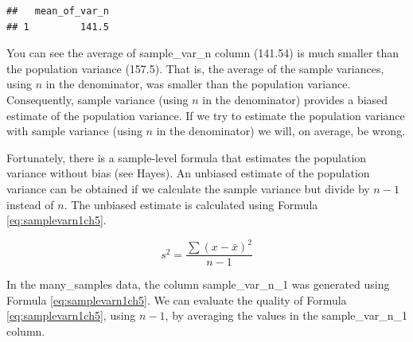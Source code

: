 \documentclass[
]{krantz}
\makeatletter
\newenvironment{Shaded}{\begin{snugshade}}{\end{snugshade}}
\newcommand{\DataTypeTok}[1]{\textcolor[rgb]{0.27,0.27,0.27}{#1}}
\newcommand{\DecValTok}[1]{\textcolor[rgb]{0.06,0.06,0.06}{#1}}
\newcommand{\KeywordTok}[1]{\textcolor[rgb]{0.27,0.27,0.27}{\textbf{#1}}}
\newcommand{\NormalTok}[1]{#1}
\newcommand{\OperatorTok}[1]{\textcolor[rgb]{0.43,0.43,0.43}{\textbf{#1}}}
\newcommand{\StringTok}[1]{\textcolor[rgb]{0.5,0.5,0.5}{#1}}
\newenvironment{kframe}{%
\medskip{}
\setlength{\fboxsep}{.8em}
 \def\at@end@of@kframe{}%
 \ifinner\ifhmode%
  \def\at@end@of@kframe{\end{minipage}}%
  \begin{minipage}{\columnwidth}%
 \fi\fi%
 \def\FrameCommand##1{\hskip\@totalleftmargin \hskip-\fboxsep
 \colorbox{shadecolor}{##1}\hskip-\fboxsep
     \hskip-\linewidth \hskip-\@totalleftmargin \hskip\columnwidth}%
 \MakeFramed {\advance\hsize-\width
   \@totalleftmargin\z@ \linewidth\hsize
   \@setminipage}}%
 {\par\unskip\endMakeFramed%
 \at@end@of@kframe}
\renewenvironment{Shaded}{\begin{kframe}}{\end{kframe}}
\makeatother
\begin{document}
\begin{Shaded}
\end{Shaded}

\begin{verbatim}
##   mean_of_var_n
## 1         141.5
\end{verbatim}

You can see the average of sample\_var\_n column (141.54) is much smaller than the population variance (157.5). That is, the average of the sample variances, using \(n\) in the denominator, was smaller than the population variance. Consequently, sample variance (using \(n\) in the denominator) provides a biased estimate of the population variance. If we try to estimate the population variance with sample variance (using \(n\) in the denominator) we will, on average, be wrong.

Fortunately, there is a sample-level formula that estimates the population variance without bias (see Hayes). An unbiased estimate of the population variance can be obtained if we calculate the sample variance but divide by \(n - 1\) instead of \(n\). The unbiased estimate is calculated using Formula \eqref{eq:samplevarn1ch5}.

\begin{equation} 
s^2 = \frac{\sum{(x - \bar{x})^2}}{n-1}
      \label{eq:samplevarn1ch5}
\end{equation}

In the many\_samples data, the column sample\_var\_n\_1 was generated using Formula \eqref{eq:samplevarn1ch5}. We can evaluate the quality of Formula \eqref{eq:samplevarn1ch5}, using \(n-1\), by averaging the values in the sample\_var\_n\_1 column.

\begin{Shaded}
\end{Shaded}
\end{document}
